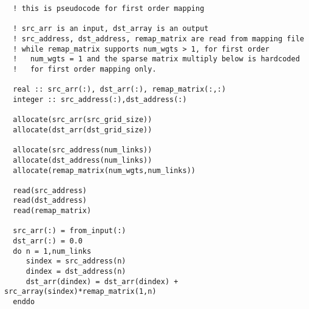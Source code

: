 \begin{verbatim}
  ! this is pseudocode for first order mapping

  ! src_arr is an input, dst_array is an output
  ! src_address, dst_address, remap_matrix are read from mapping file
  ! while remap_matrix supports num_wgts > 1, for first order
  !   num_wgts = 1 and the sparse matrix multiply below is hardcoded
  !   for first order mapping only.

  real :: src_arr(:), dst_arr(:), remap_matrix(:,:)
  integer :: src_address(:),dst_address(:)

  allocate(src_arr(src_grid_size))
  allocate(dst_arr(dst_grid_size))

  allocate(src_address(num_links))
  allocate(dst_address(num_links))
  allocate(remap_matrix(num_wgts,num_links))

  read(src_address)
  read(dst_address)
  read(remap_matrix)

  src_arr(:) = from_input(:)
  dst_arr(:) = 0.0
  do n = 1,num_links
     sindex = src_address(n)
     dindex = dst_address(n)
     dst_arr(dindex) = dst_arr(dindex) + src_array(sindex)*remap_matrix(1,n)
  enddo
\end{verbatim}


